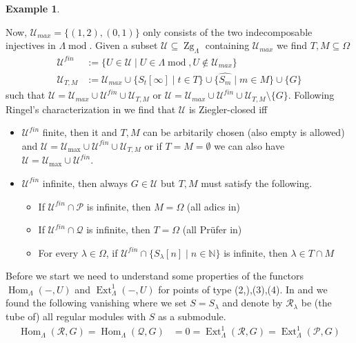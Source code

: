\documentclass[11pt,a4paper]{amsart}
\theoremstyle{plain}
\theoremstyle{definition}
\newtheorem{exa}[thm]{Example}
\DeclareMathOperator{\Hom}{Hom}
\DeclareMathOperator{\Ext}{Ext}
\DeclareMathOperator{\modu}{mod}
\newcommand{\La}{\Lambda}
\newcommand{\mcP}{\mathcal{P}}
\newcommand{\mcQ}{\mathcal{Q}}
\newcommand{\mcR}{\mathcal{R}}
\newcommand{\mcU}{\mathcal{U}}
\DeclareMathOperator{\Zg}{Zg}
\begin{document}
\begin{exa}
\begin{itemize}
\end{itemize}
Now, $\mcU_{max}=\{ (1,2), (0,1)\}$ only consists of the two indecomposable injectives in $\La\modu$. Given a subset $\mcU\subseteq \Zg_{\La}$ containing $\mcU_{max}$ we find $T,M\subseteq \Omega $ 
\[
\begin{aligned}
\mcU^{fin} &:=\{U \in \mcU\mid U \in \La \modu, U \notin \mcU_{max}\}\\
\mcU_{T,M} &:=\mcU_{max}\cup \{S_{t}[\infty] \mid t\in T\}\cup \{ \hat{S_m} \mid m \in M\} \cup \{G\}
\end{aligned}
\]
such that $\mcU=\mcU_{max} \cup \mcU^{fin} \cup \mcU_{T,M}$ or 
$\mcU=\mcU_{max} \cup \mcU^{fin} \cup \mcU_{T,M}\setminus \{G\}$. 
Following Ringel's characterization in \cite{Ri-Ziegler} we find that $\mcU$ is Ziegler-closed iff   
\begin{itemize}
    \item[(a)] $\mcU^{fin}$ finite, then it and $T,M$ can be arbitarily  chosen (also empty is allowed) and 
    $\mcU=\mcU_{\max}\cup \mcU^{fin}\cup \mcU_{T,M}$ or if $T=M=\emptyset$ we can also have $\mcU= \mcU_{\max}\cup \mcU^{fin}$. 
    \item[(b)] $\mcU^{fin}$ infinite, then always $G \in \mcU$ but $T,M$ must satisfy the following. 
    \begin{itemize}
    \item[(c1)] If $\mcU^{fin}\cap \mcP$ is infinite, then $M=\Omega$ (all adics in) %
    \item[(c2)] If $\mcU^{fin}\cap \mcQ$ is infinite, then $T=\Omega$ (all Pr\"ufer in)
    \item[(c3)] For every $\lambda \in \Omega$, if $\mcU^{fin}\cap \{S_{\lambda} [n]\mid n \in \mathbb{N}\}$ is infinite, then $\lambda \in T\cap M$
    \end{itemize}
\end{itemize}
Before we start we need to understand some properties of the functors $\Hom_{\La} (-,U)$ and $\Ext^1_{\La}(-,U)$ for points of type (2,),(3),(4). In \cite[p. 46]{Ri-Inf} and \cite[section 3]{CB-Inf} we found the following vanishing where we set $S=S_{\lambda}$ and denote by $\mcR_{\lambda}$ be (the tube of) all regular modules with $S$ as a submodule. 
\[
\begin{aligned}
\Hom_{\La}(\mcR, G)=\Hom_{\La}(\mcQ, G) &=0 = \Ext^1_{\La}(\mcR ,G)=\Ext^1_{\La} (\mcP, G)\\

\end{aligned}\]
\end{exa}
\end{document}

